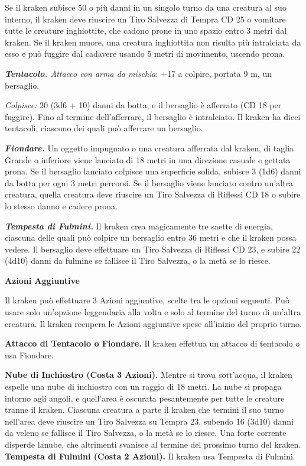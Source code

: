 \begin{multicols}{2}
Se il kraken subisce 50 o più danni in un singolo turno da una creatura al suo interno, il kraken deve riuscire un Tiro Salvezza di Tempra CD 25 o vomitare tutte le creature inghiottite, che cadono prone in uno spazio entro 3 metri dal kraken. Se il kraken muore, una creatura inghiottita non risulta più intralciata da esso e può fuggire dal cadavere usando 5 metri di movimento, uscendo prona.

\emph{\textbf{Tentacolo.} Attacco con arma da mischia}: +17 a colpire, portata 9 m, un bersaglio.

\emph{Colpisce:} 20 (3d6 + 10) danni da botta, e il bersaglio è afferrato (CD 18 per fuggire). Fino al termine dell'afferrare, il bersaglio è intralciato. Il kraken ha dieci tentacoli, ciascuno dei
quali può afferrare un bersaglio.

\emph{\textbf{Fiondare.}} Un oggetto impugnato o una creatura afferrata dal kraken, di taglia Grande o inferiore viene lanciato di 18 metri in una direzione casuale e gettata prona. Se il bersaglio lanciato colpisce una superficie solida, subisce 3 (1d6) danni da botta per ogni 3 metri percorsi. Se il bersaglio viene lanciato contro un'altra creatura, quella creatura deve riuscire un Tiro Salvezza di Riflessi CD 18 o subire lo stesso danno e cadere prona.

\emph{\textbf{Tempesta di Fulmini.}} Il kraken crea magicamente tre saette di energia, ciascuna delle quali può colpire un bersaglio entro 36 metri e che il kraken possa vedere. Il bersaglio deve effettuare un Tiro Salvezza di Riflessi CD 23, e subire 22 (4d10) danni da fulmine se fallisce il Tiro Salvezza, o la metà se lo riesce.

\textbf{Azioni Aggiuntive}

Il kraken può effettuare 3 Azioni aggiuntive, scelte tra le opzioni seguenti. Può usare solo un'opzione leggendaria alla volta e solo al termine del turno di un'altra creatura. Il kraken recupera le Azioni aggiuntive spese all'inizio del proprio turno.

\textbf{Attacco di Tentacolo o Fiondare.} Il kraken effettua un attacco di tentacolo o usa Fiondare.

\textbf{Nube di Inchiostro (Costa 3 Azioni).} Mentre si trova sott'acqua, il kraken espelle una nube di inchiostro con un raggio di 18 metri. La nube si propaga intorno agli angoli, e quell'area è oscurata pesantemente per tutte le creature tranne il kraken. Ciascuna creatura a parte il kraken che termini il suo turno nell'area deve riuscire un Tiro Salvezza su Tempra 23, subendo 16 (3d10) danni da veleno se fallisce il Tiro Salvezza, o la metà se lo riesce. Una forte corrente disperde lanube, che altrimenti svanisce al termine del prossimo turno  del kraken. \textbf{Tempesta di Fulmini (Costa 2 Azioni).} Il kraken usa Tempesta di Fulmini.


\end{multicols}
